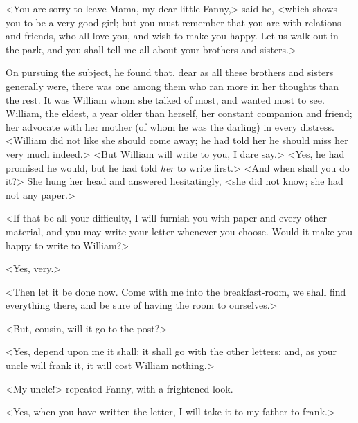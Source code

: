 <You are sorry to leave Mama, my dear little Fanny,> said he, <which shows you to be a very good girl; but you must remember that you are with relations and friends, who all love you, and wish to make you happy. Let us walk out in the park, and you shall tell me all about your brothers and sisters.>

On pursuing the subject, he found that, dear as all these brothers and sisters generally were, there was one among them who ran more in her thoughts than the rest. It was William whom she talked of most, and wanted most to see. William, the eldest, a year older than herself, her constant companion and friend; her advocate with her mother (of whom he was the darling) in every distress. <William did not like she should come away; he had told her he should miss her very much indeed.> <But William will write to you, I dare say.> <Yes, he had promised he would, but he had told \textit{her}  to write first.> <And when shall you do it?> She hung her head and answered hesitatingly, <she did not know; she had not any paper.>

<If that be all your difficulty, I will furnish you with paper and every other material, and you may write your letter whenever you choose. Would it make you happy to write to William?>

<Yes, very.>

<Then let it be done now. Come with me into the breakfast-room, we shall find everything there, and be sure of having the room to ourselves.>

<But, cousin, will it go to the post?>

<Yes, depend upon me it shall: it shall go with the other letters; and, as your uncle will frank it, it will cost William nothing.>

<My uncle!> repeated Fanny, with a frightened look.

<Yes, when you have written the letter, I will take it to my father to frank.>

